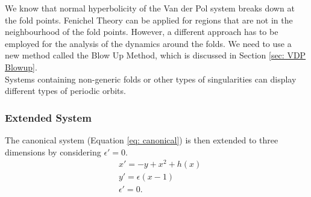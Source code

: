 We know that normal hyperbolicity of the Van der Pol system breaks down at the fold points. Fenichel Theory can be applied for regions that are not in the neighbourhood of the fold points. However, a different approach has to be employed for the analysis of the dynamics around the folds. We need to use a new method called the Blow Up Method, which is discussed in Section \ref{sec: VDP Blowup}.\\

Systems containing non-generic folds or other types of singularities can display different types of periodic orbits.
\subsubsection{Extended System} \label{sec: extended sys blowup}
The canonical system (Equation \ref{eq: canonical}) is then extended to three dimensions by considering $\epsilon'=0$. 
\begin{equation} \label{extended FS}
\begin{aligned}
&x'=-y+x^2+h(x) \\
&y'=\epsilon(x-1)\\
&\epsilon'=0.
\end{aligned}
\end{equation}


